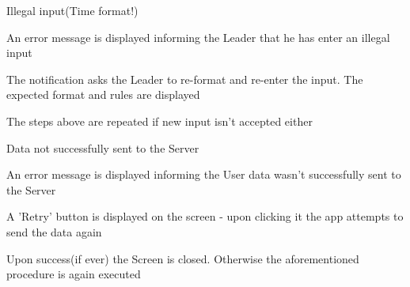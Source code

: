 \begin{packed_item}
\begin{packed_item}
					\item[7.a] Illegal input(Time format!)
					\item[] \begin{packed_enum}
						\item An error message is displayed informing the Leader that he has enter an illegal input
						\item The notification asks the Leader to re-format and re-enter the input. The expected format and rules are displayed
						\item The steps above are repeated if new input isn't accepted either
					\end{packed_enum}
					
					\item[8.a] Data not successfully sent to the Server
					\item[] \begin{packed_enum}
						\item An error message is displayed informing the User data wasn't successfully sent to the Server
						\item A 'Retry' button is displayed on the screen - upon clicking it the app attempts to send the data again
						\item Upon success(if ever) the Screen is closed. Otherwise the aforementioned procedure is again executed
					\end{packed_enum}
				\end{packed_item}
			\end{packed_item}
			
